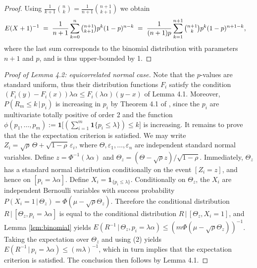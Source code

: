 \documentclass {imsart}
\begin{document}
\begin{proof}
Using $\frac{1}{k+1}\binom{n}{k} = \frac{1}{n+1}\binom{n+1}{k+1}$
we obtain
\begin{align*}
E(X+1)^{-1}&\;=\;\frac {1}{n+1} \sum_{k=0}^{n}\tbinom{n+1}{k+1}p^k (1-p)^{n-k}
\;=\;\frac{1}{(n+1)p} \sum_{k=1}^{n+1}\tbinom{n+1}{k}p^k (1-p)^{n+1-k},
\end{align*}
where the last sum corresponds to the binomial distribution with parameters $n+1$ and $p$, and is thus upper-bounded by 1.
\end{proof}

\begin{proof}[Proof of Lemma 4.2: equicorrelated normal case]
Note that the $p$-values are standard uniform, thus their distribution functions $F_i$ satisfy the condition $(F_i(y) - F_i(x))\lambda \alpha \leq F_i(\lambda \alpha)(y-x)$ of Lemma 4.1. Moreover, $P(R_m \leq k\,|\,p_i)$ is increasing in $p_i$ by Theorem 4.1 of \citet{KR1980}, since the $p_i$ are multivariate totally positive of order 2 and the function 
$\phi(p_1, \ldots, p_m):=\boldsymbol{1}[{(\sum_{i=1}^m\boldsymbol{1}\{p_i\le\lambda\}) \le k]}$ is increasing. It remains to prove that the the expectation criterion is satisfied. We may write  ${{Z}_{i}}=\sqrt{\rho }\,\Theta +\sqrt{1-\rho }\,{{\varepsilon }_{i}}$, where $\Theta,{{\varepsilon }_{1}},\ldots,{{\varepsilon }_{n}}$ are independent standard normal variables. Define $z=\Phi^{-1}(\lambda\alpha)$ and $\Theta_z=(\Theta - \sqrt{\rho} z)/\sqrt{1-\rho}$. Immediately, $\Theta_z$ has a standard normal distribution conditionally on the event $[Z_i=z]$, and hence on $[p_i=\lambda \alpha]$. Define $X_i = \boldsymbol{1}_{\{p_i \leq \lambda\}}$. Conditionally on $\Theta_z$, the $X_i$ are independent Bernoulli variables with success probability $P(X_i=1\,|\,\Theta_z)=\Phi(\mu-\sqrt{\rho}\Theta_z)$. Therefore the conditional distribution $R\,|\,[\Theta_z,p_i=\lambda \alpha]$ is equal to the conditional distribution $R\,|\,[\Theta_z,X_i=1]$, and Lemma \ref{lem:binomial} yields $E(R^{-1}\,|\,\Theta_z,p_i=\lambda\alpha)\le(m\Phi(\mu-\sqrt{\rho}\Theta_z))^{-1}$. Taking the expectation over $\Theta_z$ and using (2) yields $E(R^{-1}\,|\,p_i=\lambda\alpha)\le(m\lambda)^{-1}$, which in turn implies that the expectation criterion is satisfied. The conclusion then follows by Lemma 4.1.
\end{proof}
\end{document}
